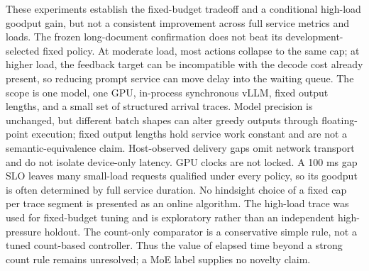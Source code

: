 These experiments establish the fixed-budget tradeoff and a conditional high-load goodput gain, but not a consistent improvement across full service metrics and loads. The frozen long-document confirmation does not beat its development-selected fixed policy. At moderate load, most actions collapse to the same cap; at higher load, the feedback target can be incompatible with the decode cost already present, so reducing prompt service can move delay into the waiting queue. The scope is one model, one GPU, in-process synchronous vLLM, fixed output lengths, and a small set of structured arrival traces. Model precision is unchanged, but different batch shapes can alter greedy outputs through floating-point execution; fixed output lengths hold service work constant and are not a semantic-equivalence claim. Host-observed delivery gaps omit network transport and do not isolate device-only latency. GPU clocks are not locked. A 100 ms gap SLO leaves many small-load requests qualified under every policy, so its goodput is often determined by full service duration. No hindsight choice of a fixed cap per trace segment is presented as an online algorithm. The high-load trace was used for fixed-budget tuning and is exploratory rather than an independent high-pressure holdout. The count-only comparator is a conservative simple rule, not a tuned count-based controller. Thus the value of elapsed time beyond a strong count rule remains unresolved; a MoE label supplies no novelty claim.
